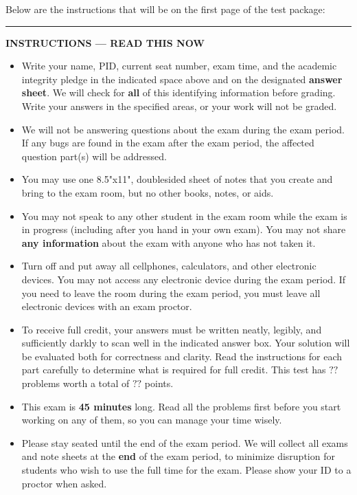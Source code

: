 \documentclass[12pt, oneside]{article}
\begin{document}
\thispagestyle{empty}

\ifsolution{}
\else{}
Below are the instructions that will be on the first page of the test package:

\begin{center}
  \begin{minipage}[t]{7in}
  \rule{\linewidth}{2pt}
  \textbf{INSTRUCTIONS --- READ THIS NOW}
  \begin{itemize}
  
  \setlength{\itemsep}{0.025in}
  
  \item  Write your name, PID, current seat number, exam time, 
  and the academic integrity pledge in the indicated space above and 
  on the designated  {\bf answer sheet}.
  We will check for {\bf all} of this identifying information before grading.
  Write your answers in the specified areas, or your work will not be graded. 
  
  \item We will not be answering questions about the exam during the exam period. 
  If any bugs are found in the exam after the exam period, the affected question part(s) will be addressed.
  
  \item  You may use one 8.5"x11", doublesided sheet of notes that you create and bring to the exam room, but no other books, notes, or aids.
  
  \item You may not speak to any other student in the exam room while the exam 
  is in progress (including after you hand in your own exam).  You may not share
  {\bf any information} about the exam with anyone who has not taken it.
  
  \item Turn off and put away all cellphones, calculators, and other electronic devices.
  You may not access any electronic device during the exam period. If you need to leave 
  the room during the exam period, you must leave all electronic devices with an exam proctor.
  
  \item  To receive full credit, your answers must
  be written neatly, legibly, and sufficiently darkly to scan well in the indicated answer box. Your solution will be evaluated both for correctness and clarity.
  Read the instructions for each part carefully to determine what is required for full credit.
  This test has $??$ problems worth a total of $??$ points.
  
  \item This exam is {\bf 45 minutes} long. Read all the problems first before you start 
  working on any of them, so you can manage your time wisely.
  
  \item Please stay seated until the end of the exam period.
  We will collect all exams and note sheets at the {\bf end} of the exam period, to minimize disruption 
  for students who wish to use the full time for the exam. Please show your ID to a proctor when 
  asked.
  
  
  \end{itemize}
  \end{minipage} \hfill
  \end{center}
\end{document}
